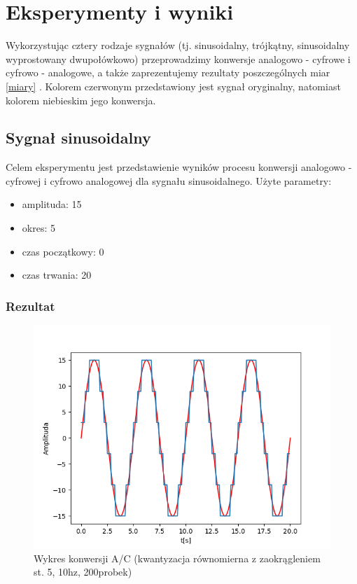 \documentclass[12pt]{article}
\begin{document}
\section{Eksperymenty i wyniki}
Wykorzystując cztery rodzaje sygnałów (tj. sinusoidalny, trójkątny, sinusoidalny wyprostowany dwupołówkowo) przeprowadzimy konwersje analogowo - cyfrowe i cyfrowo - analogowe, a także zaprezentujemy rezultaty poszczególnych miar \ref{miary} . Kolorem czerwonym przedstawiony jest sygnał oryginalny, natomiast kolorem niebieskim jego konwersja.
\subsection{Sygnał sinusoidalny}
Celem eksperymentu jest przedstawienie wyników procesu konwersji analogowo - cyfrowej i cyfrowo analogowej dla sygnału sinusoidalnego.
Użyte parametry:
\begin{itemize}
\item amplituda: 15
\item okres: 5
\item czas początkowy: 0
\item czas trwania: 20
\end{itemize}
\subsubsection{Rezultat}
\begin{figure}[H]
\centering
\includegraphics[scale=0.6]{1sinusKwantStopien5.png}
\caption{Wykres konwersji A/C (kwantyzacja równomierna z zaokrągleniem st. 5, 10hz, 200probek)}
\end{figure}
\end{document}
